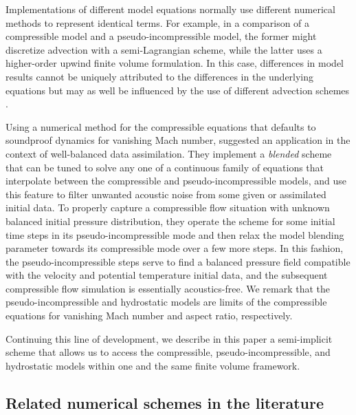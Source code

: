 \documentclass{ametsoc}
\newcommand{\sblue}[1]{\textcolor{sblue}{#1}}
\newcommand{\revision}[1]{\sblue{#1}}
\theoremstyle{definition}
\begin{document}
Implementations of different model equations normally use different numerical methods to represent identical terms. For example, in a comparison of a compressible model and a pseudo-incompressible model, the former might discretize advection with a semi-Lagrangian scheme, while the latter uses a higher-order upwind finite volume formulation. In this case, differences in model results cannot be uniquely attributed to the differences in the underlying equations but may as well be influenced by the use of different advection schemes \citep[see][for further examples]{SmolarkiewiczDoernbrack2007,BenacchioEtAl2014}.

Using a numerical method for the compressible equations that defaults to soundproof dynamics for vanishing Mach number, \citet{BenacchioEtAl2014} suggested an application in the context of well-balanced data assimilation. They implement a \textit{blended} scheme that can be tuned to solve any one of a continuous family of equations that interpolate between the compressible and pseudo-incompressible models, and use this feature to filter unwanted acoustic noise from some given or assimilated initial data. To properly capture a compressible flow situation with unknown balanced initial pressure distribution, they operate the scheme for some initial time steps in its pseudo-incompressible mode and then relax the model blending parameter towards its compressible mode over a few more steps. In this fashion, the pseudo-incompressible steps serve to find a balanced pressure field compatible with the velocity and potential temperature initial data, and the subsequent compressible flow simulation is essentially acoustics-free. \revision{We remark that the pseudo-incompressible and hydrostatic models are limits of the compressible equations for vanishing Mach number and aspect ratio, respectively.}

Continuing this line of development, we describe in this paper a semi-implicit scheme that allows us to access the compressible, pseudo-incompressible, and hydrostatic models within one and the same finite volume framework. 


\subsection{Related numerical schemes in the literature}
\end{document}
